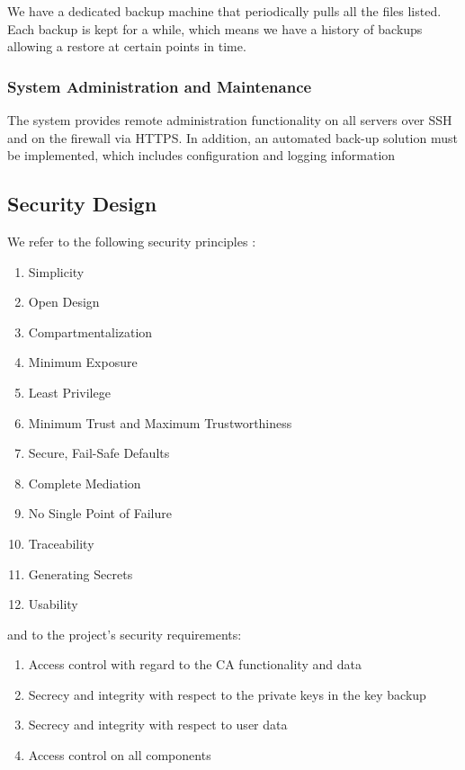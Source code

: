 \documentclass[english]{article}
\begin{document}
We have a dedicated backup machine that periodically pulls all the files listed. Each backup is kept for a while, which means we have a history of backups allowing a restore at certain points in time.

\subsubsection{System Administration and Maintenance}
The system provides remote administration functionality on all servers over SSH and on the firewall via HTTPS. In addition, an automated back-up solution must be implemented, which includes configuration and logging information

\subsection{Security Design}

We refer to the following security principles \cite{ASL_book}:
\begin{enumerate}
\setlength\itemsep{0em}
\item Simplicity
\item Open Design
\item Compartmentalization
\item Minimum Exposure
\item Least Privilege
\item Minimum Trust and Maximum Trustworthiness
\item Secure, Fail-Safe Defaults
\item Complete Mediation
\item No Single Point of Failure
\item Traceability
\item Generating Secrets
\item Usability
\end{enumerate}
and to the project's security requirements:
\begin{enumerate}[label=\alph*.]
\setlength\itemsep{0em}
\item Access control with regard to the CA functionality and data
\item Secrecy and integrity with respect to the private keys in the key backup
\item Secrecy and integrity with respect to user data
\item Access control on all components
\end{enumerate}

\end{document}
